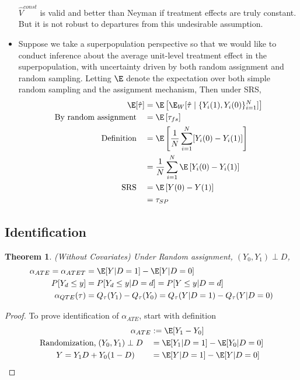 \documentclass[12pt]{article}
\theoremstyle{plain}
\newtheorem{thm}{Theorem}[section]
\theoremstyle{definition}
\theoremstyle{remark}
\newcommand{\sumiN}{\sum^N_{i=1}}
\begin{document}
\begin{itemize}
    $\hat{V}^{const}$ is valid and better than Neyman if treatment
    effects are truly constant.
    But it is not robust to departures from this undesirable assumption.


  \item
    Suppose we take a superpopulation perspective so that we would like
    to conduct inference about the average unit-level treatment effect
    in the superpopulation, with uncertainty driven by both random
    assignment and random sampling.
    Letting $\E$ denote the expectation over both simple random sampling
    and the assignment mechanism,
    Then under SRS,
    \begin{align*}
      \E[\hat{\tau}]
      &=
      \E\left[
        \E_W[
        \hat{\tau}
        \;|\;\{Y_i(1),Y_i(0)\}_{i=1}^N
        ]
      \right]
      \\
      \text{By random assignment}
      \quad
      &=
      \E\left[
        \tau_{fs}
      \right]
      \\
      \text{Definition}
      \quad
      &=
      \E\left[
        \frac{1}{N}
        \sumiN
        [Y_i(0)-Y_i(1)]
      \right]
      \\
      &=
      \frac{1}{N}
      \sumiN
      \E\left[
        Y_i(0)-Y_i(1)
      \right]
      \\
      \text{SRS}
      \quad
      &=
      \E\left[
        Y(0)-Y(1)
      \right]
      \\
      &= \tau_{SP}
    \end{align*}


\end{itemize}






\subsection{Identification}

\begin{thm}
\emph{(Without Covariates)}
Under Random assignment, $(Y_0,Y_1)\perp D$,
\begin{align*}
  \alpha_{ATE}
  =
  \alpha_{ATET}
  &=
  \E[Y|D=1]
  -
  \E[Y|D=0]
  \\
  P[Y_d\leq y]
  &=
  P[Y_d\leq y|D=d]
  =
  P[Y\leq y|D=d]
  \\
  \alpha_{QTE}(\tau)
  &=
  Q_\tau(Y_1)
  -
  Q_\tau(Y_0)
  =
  Q_\tau(Y|D=1)
  -
  Q_\tau(Y|D=0)
\end{align*}
\end{thm}
\begin{proof}
To prove identification of $\alpha_{ATE}$, start with definition
\begin{align*}
  \alpha_{ATE}
  &:=
  \E[Y_1-Y_0]
  \\
  \text{Randomization,}
  \;(Y_0,Y_1)\perp D
  \quad
  &=
  \E[Y_1|D=1]
  -
  \E[Y_0|D=0]
  \\
  Y=Y_1D+Y_0(1-D)
  \qquad
  &=
  \E[Y|D=1]
  -
  \E[Y|D=0]
\end{align*}
\end{proof}
\end{document}
